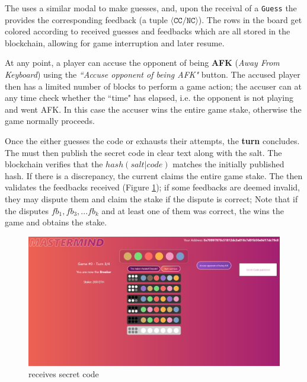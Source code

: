 The  uses a similar modal to make guesses, and, upon the receival of a \texttt{Guess} the  provides the corresponding feedback (a tuple $\langle \texttt{CC/NC} \rangle $).
The rows in the board get colored according to received guesses and feedbacks which are all stored in the blockchain, allowing for game interruption and later resume.

At any point, a player can accuse the opponent of being \textbf{AFK} (\textit{Away From Keyboard}) using the \textit{``Accuse opponent of being AFK"} button. 
The accused player then has a limited number of blocks to perform a game action; 
the accuser can at any time check whether the ``time"  has elapsed, i.e. the opponent is not playing and went AFK.
In this case the accuser wins the entire game stake, otherwise the game normally proceeds.

\newpage
Once the  either guesses the code or exhausts their attempts, the \textbf{turn} concludes. The  must then publish the secret code in clear text along with the salt. 
The blockchain verifies that the $hash(salt|code)$ matches the initially published hash. If there is a discrepancy, the current  claims the entire game stake. 
The  then validates the feedbacks received (Figure \ref{fig:breaker_secret_code}); if some feedbacks are deemed invalid, they may dispute them and claim the stake if the dispute is correct; 
Note that if the  disputes $fb_1,fb_3,...fb_k$ and at least one of them was correct, the  wins the game and obtains the stake.

\begin{figure}[htbp]
   \centering
   \includegraphics{images/board breaker.PNG}
   \caption{ receives secret code}
   \label{fig:breaker_secret_code}
\end{figure}

